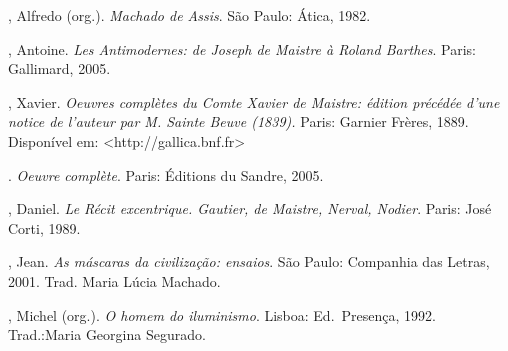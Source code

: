 \begin{bibliohedra}
\vspace{2ex}

, Alfredo (org.). \textit{Machado de Assis}. São Paulo: Ática, 1982.

, Antoine. \textit{Les Antimodernes: de Joseph de Maistre à
Roland Barthes}. Paris: Gallimard, 2005.

, Xavier. \textit{Oeuvres complètes du Comte Xavier de Maistre:
édition précédée d’une notice de l’auteur par M. Sainte Beuve (1839).}
Paris: Garnier Frères, 1889. Disponível em: <http://gallica.bnf.fr> 

\titidem. \textit{Oeuvre complète}. Paris: Éditions du Sandre,
2005.

, Daniel. \textit{Le Récit excentrique. Gautier, de Maistre,
Nerval, Nodier}. Paris: José Corti, 1989. 

, Jean. \textit{As máscaras da civilização: ensaios}. São
Paulo: Companhia das Letras, 2001. Trad. Maria Lúcia Machado. 

, Michel (org.). \textit{O homem do iluminismo}. Lisboa: 
Ed.~Presença, 1992. Trad.:Maria Georgina Segurado.
\end{bibliohedra}



